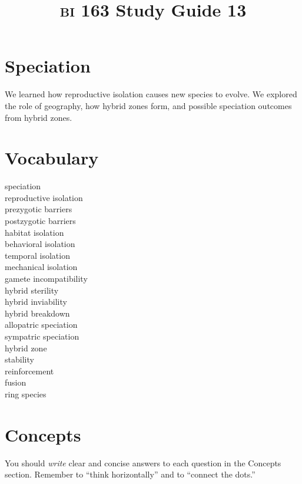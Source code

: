 \documentclass[letterpaper]{tufte-handout}
\title{{\scshape bi} 163 Study Guide 13}
\date{} %
\begin{document}
\maketitle	%

\section*{Speciation}

We learned how reproductive isolation causes new species to evolve. We explored the role of geography, how hybrid zones form, and possible speciation outcomes from hybrid zones.

\section*{Vocabulary}

\vspace{-1\baselineskip}
\begin{multicols}{2}
speciation \\
reproductive isolation \\
prezygotic barriers \\
postzygotic barriers \\
habitat isolation \\
behavioral isolation \\
temporal isolation \\
mechanical isolation \\
gamete incompatibility \\
hybrid sterility \\
hybrid inviability \\
hybrid breakdown \\
allopatric speciation \\
sympatric speciation \\
hybrid zone \\
stability \\
reinforcement \\
fusion \\
ring species 
\end{multicols}

\section*{Concepts}

You should \emph{write} clear and concise answers to each question in the Concepts section.  Remember to ``think horizontally'' and to ``connect the dots.'' 
\end{document}
